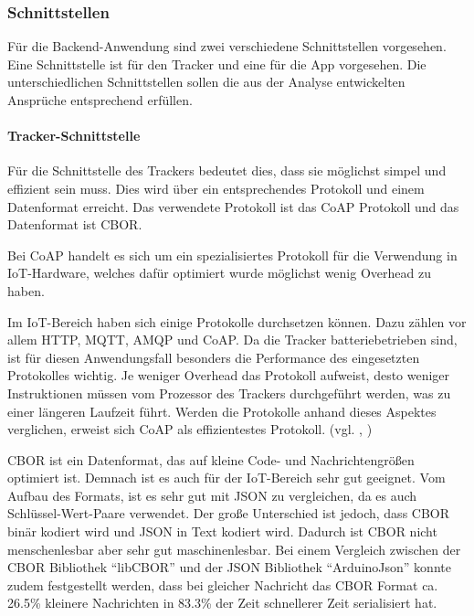 \FloatBarrier

\subsubsection{Schnittstellen}

Für die Backend-Anwendung sind zwei verschiedene Schnittstellen vorgesehen.
Eine Schnittstelle ist für den Tracker und eine für die App vorgesehen.
Die unterschiedlichen Schnittstellen sollen die aus der Analyse entwickelten Ansprüche entsprechend erfüllen.

\paragraph{Tracker-Schnittstelle}
Für die Schnittstelle des Trackers bedeutet dies, dass sie möglichst simpel und effizient sein muss.
Dies wird über ein entsprechendes Protokoll und einem Datenformat erreicht.
Das verwendete Protokoll ist das \acrfull{CoAP} Protokoll und das Datenformat ist \acrfull{CBOR}.

Bei \gls{CoAP} handelt es sich um ein spezialisiertes Protokoll für die Verwendung in
\gls{IoT}-Hardware, welches dafür optimiert wurde möglichst wenig \gls{Overhead} zu haben.

Im \gls{IoT}-Bereich haben sich einige Protokolle durchsetzen können. Dazu zählen vor allem
\gls{HTTP}, \gls{MQTT}, \gls{AMQP} und \gls{CoAP}.
Da die Tracker batteriebetrieben sind, ist für diesen Anwendungsfall besonders die Performance des
eingesetzten Protokolles wichtig. Je weniger Overhead das Protokoll aufweist, desto weniger
Instruktionen müssen vom Prozessor des Trackers durchgeführt werden, was zu einer längeren Laufzeit
führt.
Werden die Protokolle anhand dieses Aspektes verglichen, erweist sich \gls{CoAP} als effizientestes
Protokoll. (vgl. \cite{Dizdarevic2019}, \cite{Naik2017})

\gls{CBOR} ist ein Datenformat, das auf kleine Code- und Nachrichtengrößen optimiert ist.
Demnach ist es auch für der \gls{IoT}-Bereich sehr gut geeignet.
Vom Aufbau des Formats, ist es sehr gut mit \gls{JSON} zu vergleichen, da es auch Schlüssel-Wert-Paare verwendet.
Der große Unterschied ist jedoch, dass \gls{CBOR} binär kodiert wird und \gls{JSON} in Text kodiert wird.
Dadurch ist \gls{CBOR} nicht menschenlesbar aber sehr gut maschinenlesbar.
Bei einem Vergleich zwischen der \gls{CBOR} Bibliothek \enquote{libCBOR} und der \gls{JSON} Bibliothek \enquote{ArduinoJson}
konnte zudem festgestellt werden, dass bei gleicher Nachricht das \gls{CBOR} Format ca. 26.5\% kleinere Nachrichten
in 83.3\% der Zeit schnellerer Zeit serialisiert hat.

